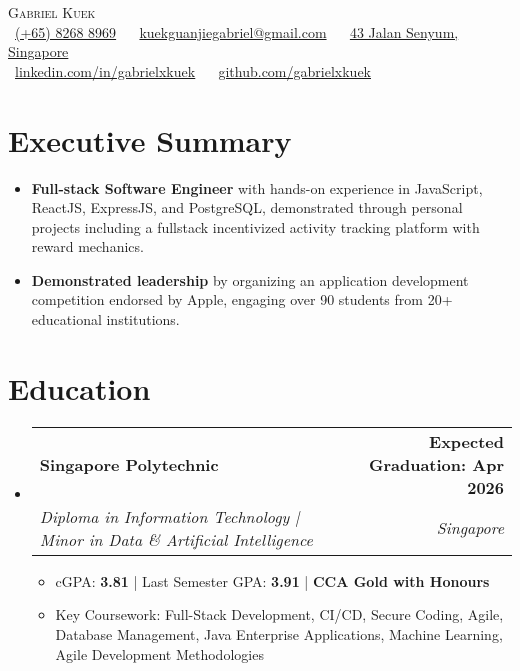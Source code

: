 \documentclass[letterpaper,11pt]{article}
\makeatletter
\newcommand{\resumeItem}[1]{
  \item\small{#1}
}
\newcommand{\resumeSubheading}[4]{
  \vspace{-2pt}\item
    \begin{tabular*}{1.0\textwidth}[t]{l@{\extracolsep{\fill}}r}
      \textbf{#1} & \textbf{\small #2} \\
      \textit{\small#3} & \textit{\small #4} \\
    \end{tabular*}\vspace{-7pt}
}
\newcommand{\resumeSubHeadingListStart}{\begin{itemize}[leftmargin=0.0in, label={}]}
\newcommand{\resumeSubHeadingListEnd}{\end{itemize}}
\newcommand{\resumeItemListStart}{\begin{itemize}}
\newcommand{\resumeItemListEnd}{\end{itemize}\vspace{-5pt}}
\makeatother
\begin{document}
\begin{center}
    {\Large \scshape Gabriel Kuek} \\[2mm]
    \footnotesize
    \faPhone\ \underline{(+65) 8268 8969} ~ 
    {\faEnvelope\  \underline{kuekguanjiegabriel@gmail.com}} ~ 
    {\faHome\ \underline{43 Jalan Senyum, Singapore}} \\[1mm]
    {\faLinkedin\ \underline{\href{https://www.linkedin.com/in/gabrielxkuek/}{linkedin.com/in/gabrielxkuek}}}  ~
    {\faGithub\ \underline{\href{https://github.com/gabrielxkuek}{github.com/gabrielxkuek}}}
    \vspace{-8pt}
\end{center}

\section{Executive Summary}
  \resumeSubHeadingListStart
    \resumeItemListStart
        \resumeItem{\textbf{Full-stack Software Engineer} with hands-on experience in JavaScript, ReactJS, ExpressJS, and PostgreSQL, demonstrated through personal projects including a fullstack incentivized activity tracking platform with reward mechanics.}
        \resumeItem{\textbf{Demonstrated leadership} by organizing an application development competition endorsed by Apple, engaging over 90 students from 20+ educational institutions.}
    \resumeItemListEnd
  \resumeSubHeadingListEnd
\vspace{-16pt}

\section{Education}
  \resumeSubHeadingListStart
    \resumeSubheading
      {Singapore Polytechnic}{Expected Graduation: Apr 2026}
      {Diploma in Information Technology | Minor in Data \& Artificial Intelligence}{Singapore}
    \resumeItemListStart
        \resumeItem{cGPA: \textbf{3.81} | Last Semester GPA: \textbf{3.91} | \textbf{CCA Gold with Honours}}
        \resumeItem{Key Coursework: Full-Stack Development, CI/CD, Secure Coding, Agile, Database Management, Java Enterprise Applications, Machine Learning, Agile Development Methodologies}
    \resumeItemListEnd
  \resumeSubHeadingListEnd
\vspace{-16pt}

\end{document}
